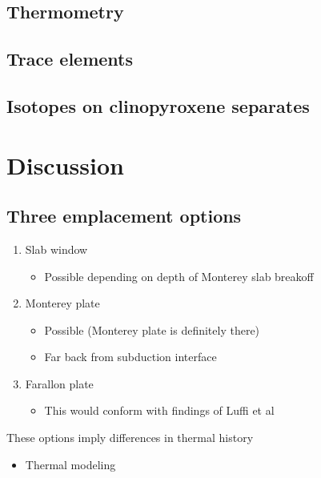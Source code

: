 \subsection{Thermometry}\label{thermometry}

\subsection{Trace elements}\label{trace-elements}

\subsection{Isotopes on clinopyroxene
separates}\label{isotopes-on-clinopyroxene-separates}

\section{Discussion}\label{discussion}

\subsection{Three emplacement options}\label{three-emplacement-options}

\begin{enumerate}
\def\labelenumi{\arabic{enumi}.}
\item
  Slab window \citet{Saleeby2003}

  \begin{itemize}
  \itemsep1pt\parskip0pt
  \item
    Possible depending on depth of Monterey slab breakoff
  \end{itemize}
\item
  Monterey plate

  \begin{itemize}
  \itemsep1pt\parskip0pt
  \item
    Possible (Monterey plate is definitely there)
  \item
    Far back from subduction interface
  \end{itemize}
\item
  Farallon plate

  \begin{itemize}
  \itemsep1pt\parskip0pt
  \item
    This would conform with findings of Luffi et al
  \end{itemize}
\end{enumerate}

These options imply differences in thermal history

\begin{itemize}
\itemsep1pt\parskip0pt
\item
  Thermal modeling
\end{itemize}
